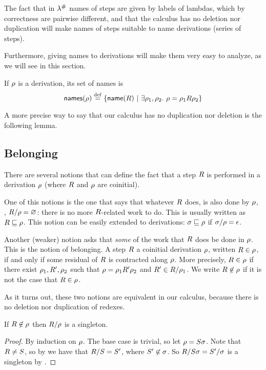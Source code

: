 
The fact that in $\lambda^{\mathtt{\#}}$ names of steps
are given by labels of lambdas, which by correctness are pairwise different,
and that the calculus has no deletion nor duplication will
make names of steps suitable to name derivations (\ie series of steps).

Furthermore, giving names to derivations will make them very easy to analyze, as we
will see in this section.

\begin{definition}
If $\rho$ is a derivation, its set of names is
\[
  \mathsf{names}(\rho) \overset{\mathrm{def}}{=} \{\mathsf{name}(R) \ |\  \exists \rho_1,\rho_2.\ \rho = \rho_1R\rho_2\}
\]
\end{definition}

A more precise way to say that our calculus has no duplication nor deletion is the following lemma.


\subsection*{Belonging}

There are several notions that can define the fact that a step $R$ is performed in
a derivation $\rho$ (where $R$ and $\rho$ are coinitial).

One of this notions is the one that says that whatever $R$ does,
is also done by $\rho$, \ie, $R / \rho = \varnothing$:
there is no more $R$-related work to do. This is usually written as
$R \sqsubseteq \rho$. This notion can be easily extended to derivations:
$\sigma \sqsubseteq \rho$ if $\sigma / \rho = \epsilon$.

Another (weaker) notion asks that \emph{some} of the work that $R$ does be
done in $\rho$. This is the notion of belonging.
A step $R$  a coinitial derivation $\rho$,
written $R \in \rho$,
if and only if some residual of $R$ is contracted along $\rho$. 
More precisely, $R \in \rho$ if there exist $\rho_1,R',\rho_2$
such that $\rho = \rho_1R'\rho_2$ and $R' \in R/\rho_1$.
We write $R \not\in \rho$ if it is not the case that $R \in \rho$.

As it turns out, these two notions are equivalent in our calculus, because
there is no deletion nor duplication of redexes.

\begin{lemma}[Permanence]
If $R \not\in \rho$ then $R/\rho$ is a singleton.
\end{lemma}
\begin{proof}
By induction on $\rho$. The base case is trivial, so let $\rho = S\sigma$. 
Note that $R \neq S$, so by 
we have that $R/S = S'$,
where $S' \not\in \sigma$.
So $R/S\sigma = S'/\sigma$ is a singleton by \ih.
\end{proof}

